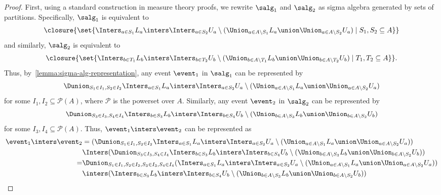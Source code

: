 \begin{proof}
      First, using a standard construction in measure theory proofs,
      we rewrite $\salg_1$ and $\salg_2$ as sigma algebra generated
      by sets of partitions.
      Specifically, $\salg_1$ is equivalent to
      \[
        \closure{\set{\Inters_{a \in S_1} L_a \inters \Inters_{a \in S_2} U_a \setminus (\Union_{a \in A \setminus S_1} L_a \union \Union_{a \in A \setminus S_2} U_a)  \mid S_1, S_2 \subseteq A}}
      \]
      and similarly, $\salg_2$ is equivalent to
      \[
        \closure{\set{\Inters_{b \in T_1} L_b \inters \Inters_{b \in T_2} U_b \setminus (\Union_{b \in A \setminus T_1} L_b \union \Union_{b \in A \setminus T_2} U_b)  \mid T_1, T_2 \subseteq A}}.
      \]
      Thus, by~\cref{lemma:sigma-alg-representation}, any event $\event_1$ in
      $\salg_1$ can be represented by
      \[
        \Dunion_{S_1 \in I_1, S_2 \in I_2}
        \Inters_{a \in S_1} L_a \inters \Inters_{a \in S_2} U_a \setminus (\Union_{a \in A \setminus S_1} L_a \union \Union_{a \in A \setminus S_2} U_a)
      \]
      for some $I_1, I_2 \subseteq \mathcal{P}(A)$, where
      $\mathcal{P}$ is the powerset over $A$.
      Similarly, any event $\event_2$ in $\salg_2$ can be represented by
      \[
        \Dunion_{S_3 \in I_3, S_4 \in I_4}
        \Inters_{b \in S_3} L_b \inters \Inters_{b \in S_4} U_b \setminus (\Union_{b \in A \setminus S_3} L_b \union \Union_{b \in A \setminus S_2} U_b)
      \]
      for some  $I_3, I_4 \subseteq \mathcal{P}(A)$.
      Thus, $\event_1 \inters \event_2$ can be represented as
      \begin{align*}
        \event_1 \inters \event_2
        &=(\Dunion_{S_1 \in I_1, S_2 \in I_2}
        \Inters_{a \in S_1} L_a \inters \Inters_{a \in S_2} U_a \setminus (\Union_{a \in A \setminus S_1} L_a \union \Union_{a \in A \setminus S_2} U_a) ) \\
        &\Inters
        (\Dunion_{S_3 \in I_3, S_4 \in I_4}
        \Inters_{b \in S_3} L_b \inters \Inters_{b \in S_4} U_b \setminus (\Union_{b \in A \setminus S_3} L_b \union \Union_{b \in A \setminus S_2} U_b) )\\
        = & \Dunion_{S_1 \in I_1, S_2 \in I_2, S_3 \in I_3, S_4 \in I_4} (\Inters_{a \in S_1} L_a \inters \Inters_{a \in S_2} U_a \setminus (\Union_{a \in A \setminus S_1} L_a \union \Union_{a \in A \setminus S_2} U_a) ) \\
          &\inters ( \Inters_{b \in S_3} L_b \inters \Inters_{b \in S_4} U_b \setminus (\Union_{b \in A \setminus S_3} L_b \union \Union_{b \in A \setminus S_2} U_b) )
      \end{align*}


\end{proof}
